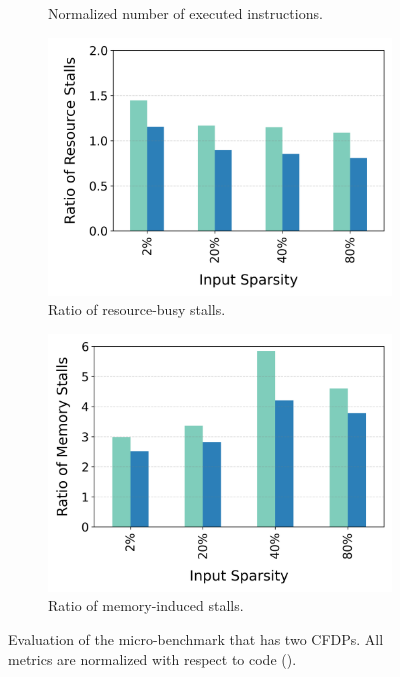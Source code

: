 \begin{figure}[t]
\begin{subfigure}{.36\textwidth}
    \caption{Normalized number of executed instructions.}
    \label{fig:if-then-else-many-scatter-inst}
  \end{subfigure}
  \begin{subfigure}{.36\textwidth}
    \centering
    \includegraphics[width=\textwidth]{Figures/Evaluations/if_then_else_many_scatter_resource_stalls.png}
    \caption{Ratio of resource-busy stalls.}
    \label{fig:if-then-else-many-scatter-resource}
  \end{subfigure}%
  \begin{subfigure}{.36\textwidth}
        \centering
    \includegraphics[width=\textwidth]{Figures/Evaluations/if_then_else_many_scatter_mem_stalls.png}
    \caption{Ratio of memory-induced stalls.}
    \label{fig:if-then-else-many-scatter-mem-stalls}
  \end{subfigure}%
  \caption{Evaluation of the \ifElseBench micro-benchmark that has two CFDPs. All metrics are normalized with respect to \ifconverted code (\ifconv).}
\end{figure}

